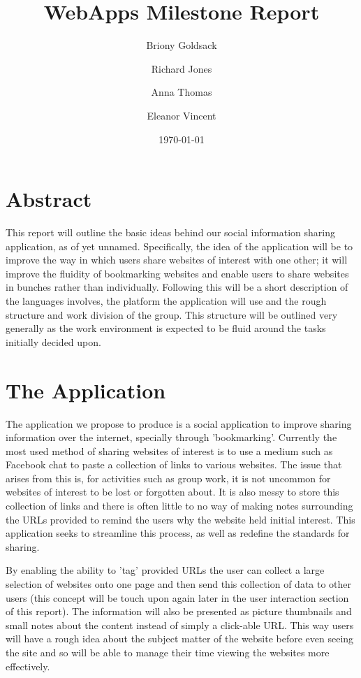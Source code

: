 \documentclass[a4wide, 10pt]{article}
\begin{document}
\title{WebApps Milestone Report}
\author{Briony Goldsack \and Richard Jones \and Anna Thomas \and Eleanor Vincent}
\date{\today}         
\maketitle            

\section{Abstract}

This report will outline the basic ideas behind our social information sharing application, as of yet unnamed. Specifically, the idea of the application will be to improve the way in which users share websites of interest with one other; it will improve the fluidity of bookmarking websites and enable users to share websites in bunches rather than individually. Following this will be a short description of the languages involves, the platform the application will use and the rough structure and work division of the group. This structure will be outlined very generally as the work environment is expected to be fluid around the tasks initially decided upon.

\section{The Application}

The application we propose to produce is a social application to improve sharing information over the internet, specially through 'bookmarking'. Currently the most used method of sharing websites of interest is to use a medium such as Facebook chat to paste a collection of links to various websites. The issue that arises from this is, for activities such as group work, it is not uncommon for websites of interest to be lost or forgotten about. It is also messy to store this collection of links and there is often little to no way of making notes surrounding the URLs provided to remind the users why the website held initial interest. This application seeks to streamline this process, as well as redefine the standards for sharing. 

By enabling the ability to 'tag' provided URLs the user can collect a large selection of websites onto one page and then send this collection of data to other users (this concept will be touch upon again later in the user interaction section of this report). The information will also be presented as picture thumbnails and small notes about the content instead of simply a click-able URL. This way users will have a rough idea about the subject matter of the website before even seeing the site and so will be able to manage their time viewing the websites more effectively. 
\end{document}

